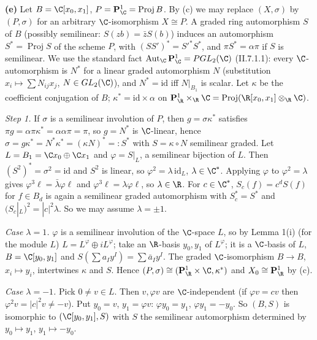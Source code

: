 \documentclass[11pt]{article}
\begin{document}
\textbf{(e)} Let $B=\C[x_0,x_1]$, $P=\mathbf P^1_{\C}=\operatorname{Proj}B$. By (c) we may replace $(X,\sigma)$ by $(P,\sigma)$ for an arbitrary $\C$-isomorphism $X\cong P$. A graded ring automorphism $S$ of $B$ (possibly semilinear: $S(zb)=\bar zS(b)$) induces an automorphism $S^*=\operatorname{Proj}S$ of the scheme $P$, with $(SS')^*=S'^*S^*$, and $\pi S^*=\alpha\pi$ if $S$ is semilinear. We use the standard fact $\operatorname{Aut}_{\C}\mathbf P^1_{\C}=PGL_2(\C)$ (II.7.1.1): every $\C$-automorphism is $N^*$ for a linear graded automorphism $N$ (substitution $x_i\mapsto\sum N_{ij}x_j$, $N\in GL_2(\C)$), and $N^*=\mathrm{id}$ iff $N|_{B_1}$ is scalar. Let $\kappa$ be the coefficient conjugation of $B$; $\kappa^*=\mathrm{id}\times\alpha$ on $\mathbf P^1_{\R}\times_{\R}\C=\operatorname{Proj}(\R[x_0,x_1]\otimes_{\R}\C)$.

\emph{Step 1.} If $\sigma$ is a semilinear involution of $P$, then $g=\sigma\kappa^*$ satisfies $\pi g=\alpha\pi\kappa^*=\alpha\alpha\pi=\pi$, so $g=N^*$ is $\C$-linear, hence $\sigma=g\kappa^*=N^*\kappa^*=(\kappa N)^*=:S^*$ with $S=\kappa\circ N$ semilinear graded. Let $L=B_1=\C x_0\oplus\C x_1$ and $\varphi=S|_L$, a semilinear bijection of $L$. Then $(S^2)^*=\sigma^2=\mathrm{id}$ and $S^2$ is linear, so $\varphi^2=\lambda\,\mathrm{id}_L$, $\lambda\in\C^*$. Applying $\varphi$ to $\varphi^2=\lambda$ gives $\varphi^3\ell=\bar\lambda\varphi\ell$ and $\varphi^3\ell=\lambda\varphi\ell$, so $\lambda\in\R$. For $c\in\C^*$, $S_c(f)=c^dS(f)$ for $f\in B_d$ is again a semilinear graded automorphism with $S_c^*=S^*$ and $(S_c|_L)^2=|c|^2\lambda$. So we may assume $\lambda=\pm1$.

\emph{Case $\lambda=1$.} $\varphi$ is a semilinear involution of the $\C$-space $L$, so by Lemma 1(i) (for the module $L$) $L=L^\varphi\oplus iL^\varphi$; take an $\R$-basis $y_0,y_1$ of $L^\varphi$; it is a $\C$-basis of $L$, $B=\C[y_0,y_1]$ and $S(\sum a_Iy^I)=\sum\bar a_Iy^I$. The graded $\C$-isomorphism $B\to B$, $x_i\mapsto y_i$, intertwines $\kappa$ and $S$. Hence $(P,\sigma)\cong(\mathbf P^1_{\R}\times\C,\kappa^*)$ and $X_0\cong\mathbf P^1_{\R}$ by (c).

\emph{Case $\lambda=-1$.} Pick $0\neq v\in L$. Then $v,\varphi v$ are $\C$-independent (if $\varphi v=cv$ then $\varphi^2v=|c|^2v\neq-v$). Put $y_0=v$, $y_1=\varphi v$: $\varphi y_0=y_1$, $\varphi y_1=-y_0$. So $(B,S)$ is isomorphic to $(\C[y_0,y_1],S)$ with $S$ the semilinear automorphism determined by $y_0\mapsto y_1$, $y_1\mapsto-y_0$.
\end{document}

